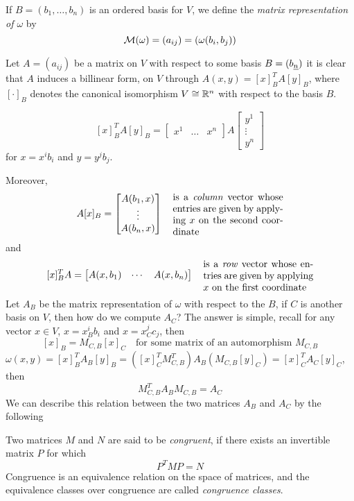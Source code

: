 \documentclass[../main-manifolds.tex]{subfiles}
\begin{document}
    \begin{definition}
        If $B=(b_1,\ldots,b_n)$ is an ordered basis for $V$, we define the \emph{matrix representation of $\omega$} by
        \[
            \mathcal{M}(\omega) = (a_{ij}) = (\omega(b_i, b_j))
        \]
    \end{definition}
    \begin{wts}
        Let $A = (a_{ij})$ be a matrix on $V$ with respect to some basis $B = (\Ul{b}[n])$ it is clear that $A$ induces a billinear form, on $V$ through $A(x,y) = [x]_B^TA[y]_B$, where $[\cdot]_B$ denotes the canonical isomorphism $V\cong {\mathbb{R}^n}$ with respect to the basis $B$.

        \[
            [x]_B^T A [y]_B = \begin{bmatrix}
                x^1 &\ldots & x^n
            \end{bmatrix}A \begin{bmatrix}
                y^1\\
                \vdots\\
                y^n
            \end{bmatrix}
        \]
        for $x = x^ib_i$ and $y = y^jb_j$. 
    \end{wts}
    Moreover,
        \[
            A[x]_B = \begin{bmatrix}
                A(b_1,x)\\
                \vdots\\
                A(b_n,x)
            \end{bmatrix}\quad \parbox{4cm}{is a \emph{column} vector whose entries are given by applying $x$ on the second coordinate}
        \]
        and 
        \[
            [x]_B^T A = \begin{bmatrix}
                A(x,b_1) & \cdots & A(x, b_n)
            \end{bmatrix}\quad\parbox{4cm}{is a \emph{row} vector whose entries are given by applying $x$ on the first coordinate}
        \]
    Let $A_B$ be the matrix representation of $\omega$ with respect to the $B$, if $C$ is another basis on $V$, then how do we compute $A_C$? The answer is simple, recall for any vector $x\in V$, $x = x^i_Bb_i$ and $x = x^j_C c_j$, then
    \[
        [x]_B = M_{C,B}[x]_C\quad\text{for some matrix of an automorphism }M_{C,B}
    \]
    $\omega(x,y) = [x]_B^TA_B[y]_B = ([x]_C^TM_{C,B}^T)A_B(M_{C,B}[y]_C) = [x]_C^T A_C [y]_C$, then
    \begin{equation}\label{lee-chp22:congruent-matrices}
        M^T_{C,B}A_BM_{C,B} = A_C
    \end{equation}
    We can describe this relation between the two matrices $A_B$ and $A_C$ by the following
    \begin{definition}
        Two matrices $M$ and $N$ are said to be \emph{congruent}, if there exists an invertible matrix $P$ for which
        \[
            P^TMP = N
        \]
        Congruence is an equivalence relation on the space of matrices, and the equivalence classes over congruence are called \emph{congruence classes}.
    \end{definition}
    
\end{document}

